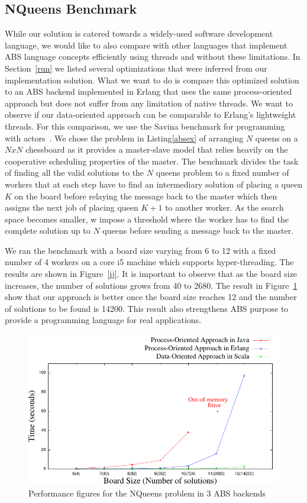 \subsection{NQueens Benchmark}
\par While our solution is catered towards a widely-used software development language, we would like to also compare with other languages that implement ABS language concepts efficiently using threads and without these limitations. In Section~\ref{run} we listed several optimizations that were inferred from our implementation solution. What we want to do is compare this optimized solution to an ABS backend implemented in Erlang that uses the same process-oriented approach but does not suffer from any limitation of native threads. We want to observe if our data-oriented approach can be comparable to Erlang's lightweight threads. For this comparison, we use the Savina benchmark for programming with actors~\cite{savina}.  We chose the problem in Listing\ref{absex} of arranging $N$ queens on a $NxN$ chessboard as it provides a master-slave model that relies heavily on the cooperative scheduling properties of the master.  The benchmark divides the task of finding all the valid solutions to the $N$ queens problem to a fixed number of workers that at each step have to find an intermediary solution of placing a queen $K$ on the board before relaying the message back to the master which then assigns the next job of placing queen $K+1$ to another worker. As the search space becomes smaller, w impose a threshold where the worker has to find the complete solution up to $N$ queens before sending a message back to the master. 
\par We ran the benchmark with a board size varying from 6 to 12 with a fixed number of 4 workers on a core i5 machine which supports hyper-threading. The results are shown in Figure~\ref{jj}. It is important to observe that as the board size increases, the number of solutions grows from 40 to 2680. The result in Figure~\ref{ej} show that our approach is better once the board size reaches 12 and the number of solutions to be found is 14200. This result also strengthens ABS purpose to provide a programming language for real applications.

\begin{figure}
	\centering
	\includegraphics[scale=.7]{erlj8.pdf}
	\caption{Performance figures for the NQueens problem in 3 ABS backends}
	\label{ej}
\end{figure}

